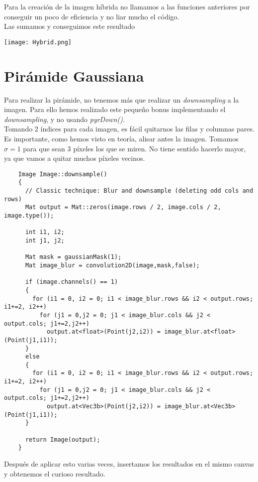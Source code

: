 \documentclass[a4paper, 11pt]{article}
\theoremstyle{definition}
\begin{document}
  Para la creación de la imagen híbrida no llamamos a las funciones anteriores
  por conseguir un poco de eficiencia y no liar mucho el código. \\

  Las sumamos y conseguimos este resultado

  \centerline{\texttt{[image: Hybrid.png]}}

  \section{Pirámide Gaussiana}

  Para realizar la pirámide, no tenemos más que realizar un \textit{downsampling}
  a la imagen. Para ello hemos realizado este pequeño bonus implementando el
  \textit{downsampling}, y no usando \textit{pyrDown()}.\\

  Tomando 2 índices para cada imagen, es fácil quitarnos las filas y columnas pares.
  Es importante, como hemos visto en teoría, alisar antes la imagen. Tomamos $\sigma=1$
  para que sean 3 píxeles los que se miren. No tiene sentido hacerlo mayor, ya que
  vamos a quitar muchos píxeles vecinos.

  \begin{lstlisting}
    Image Image::downsample()
    {
      // Classic technique: Blur and downsample (deleting odd cols and rows)
      Mat output = Mat::zeros(image.rows / 2, image.cols / 2, image.type());

      int i1, i2;
      int j1, j2;

      Mat mask = gaussianMask(1);
      Mat image_blur = convolution2D(image,mask,false);

      if (image.channels() == 1)
      {
        for (i1 = 0, i2 = 0; i1 < image_blur.rows && i2 < output.rows; i1+=2, i2++)
          for (j1 = 0,j2 = 0; j1 < image_blur.cols && j2 < output.cols; j1+=2,j2++)
            output.at<float>(Point(j2,i2)) = image_blur.at<float>(Point(j1,i1));
      }
      else
      {
        for (i1 = 0, i2 = 0; i1 < image_blur.rows && i2 < output.rows; i1+=2, i2++)
          for (j1 = 0,j2 = 0; j1 < image_blur.cols && j2 < output.cols; j1+=2,j2++)
            output.at<Vec3b>(Point(j2,i2)) = image_blur.at<Vec3b>(Point(j1,i1));
      }

      return Image(output);
    }
  \end{lstlisting}

  Después de aplicar esto varias veces, insertamos los resultados
  en el mismo canvas y obtenemos el curioso resultado.
\end{document}
